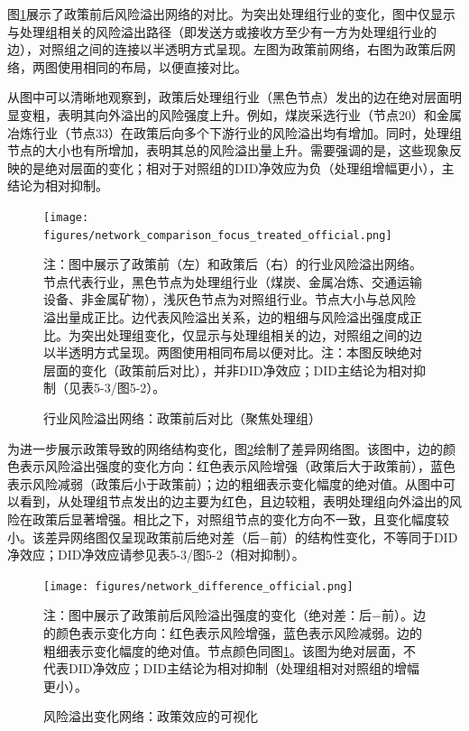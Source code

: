 图\ref{fig:network_comparison}展示了政策前后风险溢出网络的对比。为突出处理组行业的变化，图中仅显示与处理组相关的风险溢出路径（即发送方或接收方至少有一方为处理组行业的边），对照组之间的连接以半透明方式呈现。左图为政策前网络，右图为政策后网络，两图使用相同的布局，以便直接对比。

从图中可以清晰地观察到，政策后处理组行业（黑色节点）发出的边在绝对层面明显变粗，表明其向外溢出的风险强度上升。例如，煤炭采选行业（节点20）和金属冶炼行业（节点33）在政策后向多个下游行业的风险溢出均有增加。同时，处理组节点的大小也有所增加，表明其总的风险溢出量上升。需要强调的是，这些现象反映的是绝对层面的变化；相对于对照组的DID净效应为负（处理组增幅更小），主结论为相对抑制。

\begin{figure}[htbp]
\centering
\texttt{[image: figures/network\_comparison\_focus\_treated\_official.png]}
\caption{行业风险溢出网络：政策前后对比（聚焦处理组）}
\label{fig:network_comparison}
\begin{minipage}{0.9\textwidth}
\footnotesize
注：图中展示了政策前（左）和政策后（右）的行业风险溢出网络。节点代表行业，黑色节点为处理组行业（煤炭、金属冶炼、交通运输设备、非金属矿物），浅灰色节点为对照组行业。节点大小与总风险溢出量成正比。边代表风险溢出关系，边的粗细与风险溢出强度成正比。为突出处理组变化，仅显示与处理组相关的边，对照组之间的边以半透明方式呈现。两图使用相同布局以便对比。注：本图反映绝对层面的变化（政策前后对比），并非DID净效应；DID主结论为相对抑制（见表5-3/图5-2）。
\end{minipage}
\end{figure}

为进一步展示政策导致的网络结构变化，图\ref{fig:network_difference}绘制了差异网络图。该图中，边的颜色表示风险溢出强度的变化方向：红色表示风险增强（政策后大于政策前），蓝色表示风险减弱（政策后小于政策前）；边的粗细表示变化幅度的绝对值。从图中可以看到，从处理组节点发出的边主要为红色，且边较粗，表明处理组向外溢出的风险在政策后显著增强。相比之下，对照组节点的变化方向不一致，且变化幅度较小。该差异网络图仅呈现政策前后绝对差（后−前）的结构性变化，不等同于DID净效应；DID净效应请参见表5-3/图5-2（相对抑制）。

\begin{figure}[htbp]
\centering
\texttt{[image: figures/network\_difference\_official.png]}
\caption{风险溢出变化网络：政策效应的可视化}
\label{fig:network_difference}
\begin{minipage}{0.9\textwidth}
\footnotesize
注：图中展示了政策前后风险溢出强度的变化（绝对差：后−前）。边的颜色表示变化方向：红色表示风险增强，蓝色表示风险减弱。边的粗细表示变化幅度的绝对值。节点颜色同图\ref{fig:network_comparison}。该图为绝对层面，不代表DID净效应；DID主结论为相对抑制（处理组相对对照组的增幅更小）。
\end{minipage}
\end{figure}

